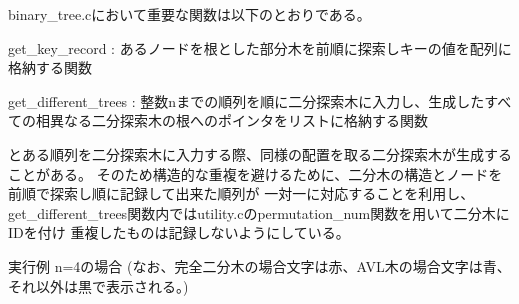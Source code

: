 \documentclass{ltjsarticle}
\begin{document}


binary\_tree.cにおいて重要な関数は以下のとおりである。

\begin{list}{}{\leftmargin=1em}
\item get\_key\_record : あるノードを根とした部分木を前順に探索しキーの値を配列に格納する関数
\item get\_different\_trees : 整数nまでの順列を順に二分探索木に入力し、生成したすべての相異なる二分探索木の根へのポインタをリストに格納する関数
\end{list}

とある順列を二分探索木に入力する際、同様の配置を取る二分探索木が生成することがある。
そのため構造的な重複を避けるために、二分木の構造とノードを前順で探索し順に記録して出来た順列が
一対一に対応することを利用し、get\_different\_trees関数内ではutility.cのpermutation\_num関数を用いて二分木にIDを付け
重複したものは記録しないようにしている。


\textrm{実行例 n=4の場合 (なお、完全二分木の場合文字は赤、AVL木の場合文字は青、それ以外は黒で表示される。)}
\end{document}
